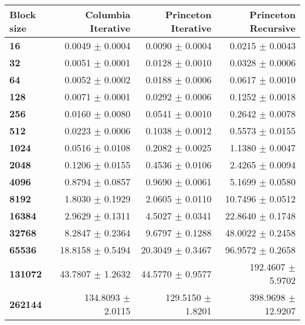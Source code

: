 \begin{tabular}{lrrr}\toprule
\textbf{Block size}  & \textbf{Columbia Iterative} & \textbf{Princeton Iterative} & \textbf{Princeton Recursive}\\\midrule
\textbf{16}  & 0.0049 $\pm$ 0.0004 & 0.0090 $\pm$ 0.0004 & 0.0215 $\pm$ 0.0043\\
\textbf{32}  & 0.0051 $\pm$ 0.0001 & 0.0128 $\pm$ 0.0010 & 0.0328 $\pm$ 0.0006\\
\textbf{64}  & 0.0052 $\pm$ 0.0002 & 0.0188 $\pm$ 0.0006 & 0.0617 $\pm$ 0.0010\\
\textbf{128}  & 0.0071 $\pm$ 0.0001 & 0.0292 $\pm$ 0.0006 & 0.1252 $\pm$ 0.0018\\
\textbf{256}  & 0.0160 $\pm$ 0.0080 & 0.0541 $\pm$ 0.0010 & 0.2642 $\pm$ 0.0078\\
\textbf{512}  & 0.0223 $\pm$ 0.0006 & 0.1038 $\pm$ 0.0012 & 0.5573 $\pm$ 0.0155\\
\textbf{1024}  & 0.0516 $\pm$ 0.0108 & 0.2082 $\pm$ 0.0025 & 1.1380 $\pm$ 0.0047\\
\textbf{2048}  & 0.1206 $\pm$ 0.0155 & 0.4536 $\pm$ 0.0106 & 2.4265 $\pm$ 0.0094\\
\textbf{4096}  & 0.8794 $\pm$ 0.0857 & 0.9690 $\pm$ 0.0061 & 5.1699 $\pm$ 0.0580\\
\textbf{8192}  & 1.8030 $\pm$ 0.1929 & 2.0605 $\pm$ 0.0110 & 10.7496 $\pm$ 0.0512\\
\textbf{16384}  & 2.9629 $\pm$ 0.1311 & 4.5027 $\pm$ 0.0341 & 22.8640 $\pm$ 0.1748\\
\textbf{32768}  & 8.2847 $\pm$ 0.2364 & 9.6797 $\pm$ 0.1288 & 48.0022 $\pm$ 0.2458\\
\textbf{65536}  & 18.8158 $\pm$ 0.5494 & 20.3049 $\pm$ 0.3467 & 96.9572 $\pm$ 0.2658\\
\textbf{131072}  & 43.7807 $\pm$ 1.2632 & 44.5770 $\pm$ 0.9577 & 192.4607 $\pm$ 5.9702\\
\textbf{262144} & 134.8093 $\pm$ 2.0115 & 129.5150 $\pm$ 1.8201 & 398.9698 $\pm$ 12.9207\\
\bottomrule
\end{tabular}
